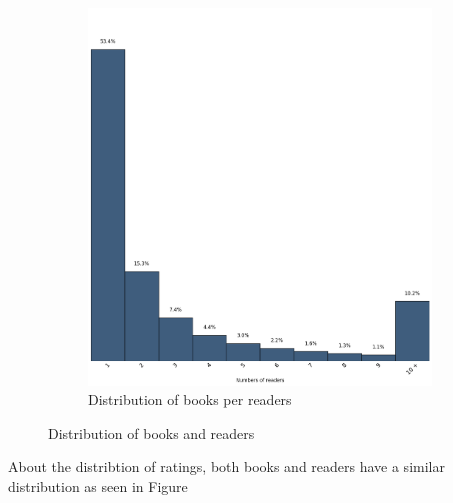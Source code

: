\documentclass[11pt]{article}
\begin{document}
\begin{figure}
\begin{subfigure}[b]{0.5\textwidth}
                \includegraphics[width=\textwidth]{images/books}
                \caption{Distribution of books per readers}
                \label{fig:books_books_read}
        \end{subfigure}
        \caption{Distribution of books and readers}
\end{figure}





About the distribtion of ratings, both books and readers have a similar distribution as seen in Figure~
\end{document}

